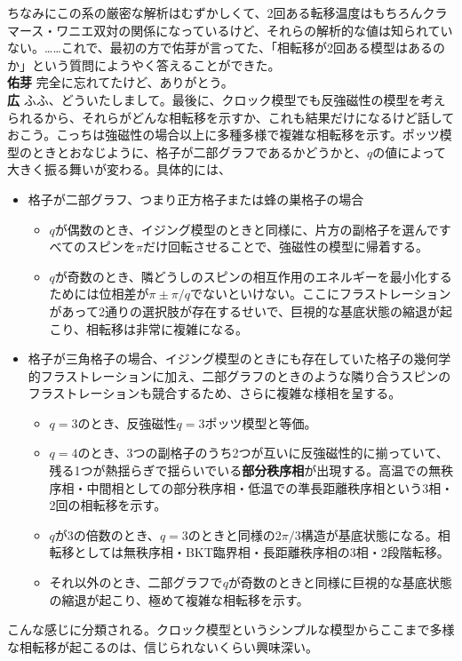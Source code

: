 \documentclass[paper=b5j,fontsize=12Q,jafontsize=12Q,baselineskip=21Q]{jlreq}
\DeclareRobustCommand{\hiron}{\textbf{広 }}
\DeclareRobustCommand{\umen}{\textbf{佑芽 }}
\begin{document}
\begin{refsection}
ちなみにこの系の厳密な解析はむずかしくて、2回ある転移温度はもちろんクラマース・ワニエ双対の関係になっているけど、それらの解析的な値は知られていない。……これで、最初の方で佑芽が言ってた、「相転移が2回ある模型はあるのか」という質問にようやく答えることができた。
\\\umen 完全に忘れてたけど、ありがとう。
\\\hiron ふふ、どういたしまして。最後に、クロック模型でも反強磁性の模型を考えられるから、それらがどんな相転移を示すか、これも結果だけになるけど話しておこう。こっちは強磁性の場合以上に多種多様で複雑な相転移を示す。ポッツ模型のときとおなじように、格子が二部グラフであるかどうかと、$q$の値によって大きく振る舞いが変わる。具体的には、
\begin{itemize}
  \item 格子が二部グラフ、つまり正方格子または蜂の巣格子の場合
  \begin{itemize}
    \item $q$が偶数のとき、イジング模型のときと同様に、片方の副格子を選んですべてのスピンを$\pi$だけ回転させることで、強磁性の模型に帰着する。
    \item $q$が奇数のとき、隣どうしのスピンの相互作用のエネルギーを最小化するためには位相差が$\pi\pm\pi/q$でないといけない。ここにフラストレーションがあって2通りの選択肢が存在するせいで、巨視的な基底状態の縮退が起こり、相転移は非常に複雑になる。
  \end{itemize}
  \item 格子が三角格子の場合、イジング模型のときにも存在していた格子の幾何学的フラストレーションに加え、二部グラフのときのような隣り合うスピンのフラストレーションも競合するため、さらに複雑な様相を呈する。
  \begin{itemize}
    \item $q=3$のとき、反強磁性$q=3$ポッツ模型と等価。
    \item $q=4$のとき、3つの副格子のうち2つが互いに反強磁性的に揃っていて、残る1つが熱揺らぎで揺らいでいる\textbf{部分秩序相}が出現する。高温での無秩序相・中間相としての部分秩序相・低温での準長距離秩序相という3相・2回の相転移を示す。
    \item $q$が3の倍数のとき、$q=3$のときと同様の$2\pi/3$構造が基底状態になる。相転移としては無秩序相・BKT臨界相・長距離秩序相の3相・2段階転移。
    \item それ以外のとき、二部グラフで$q$が奇数のときと同様に巨視的な基底状態の縮退が起こり、極めて複雑な相転移を示す。
  \end{itemize}
\end{itemize}
こんな感じに分類される。クロック模型というシンプルな模型からここまで多様な相転移が起こるのは、信じられないくらい興味深い。


\end{refsection}
\end{document}
